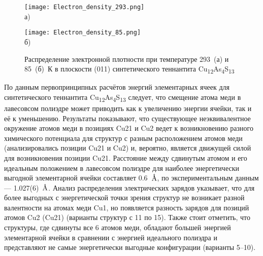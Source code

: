 \begin{figure}[ht]
  \begin{minipage}[ht]{0.5\linewidth}\centering
    \texttt{[image: Electron\_density\_293.png]} \\ а)
  \end{minipage}
  \hfill
  \begin{minipage}[ht]{0.5\linewidth}\centering
    \texttt{[image: Electron\_density\_85.png]} \\ б)
  \end{minipage}

      \caption[Распределение электронной плотности при температуре 293~(а) и 85~(б)~К в плоскости (011) синтетического теннантита Cu\textsubscript{12}As\textsubscript{4}S\textsubscript{13}]{Распределение электронной плотности при температуре 293~(а) и 85~(б)~К в плоскости (011) синтетического теннантита Cu\textsubscript{12}As\textsubscript{4}S\textsubscript{13}}
    \label{img:xray2}
\end{figure}


По данным первопринципных расчётов энергий элементарных ячеек для синтетического теннантита Cu\textsubscript{12}As\textsubscript{4}S\textsubscript{13} следует,  что смещение атома меди в лавесовсом полиэдре может приводить как к увеличению энергии ячейки, так и её к уменьшению.
Результаты показывают, что существующее неэквивалентное  окружение атомов меди в позициях Cu21 и Cu2 ведет к возникновению разного химического потенциала для структур с разным расположением атомов меди (анализировались позиции Cu21 и Cu2) и, вероятно, является движущей силой для возникновения позиции Cu21. Расстояние между сдвинутым атомом и его идеальным положением в лавесовсом полиэдре для наиболее энергетически выгодной элементарной ячейки составляет 0.6~$\mbox{\normalfont\AA}$, по экспериментальным данным --- 1.027(6)~$\mbox{\normalfont\AA}$.
Анализ распределения электрических зарядов указывает, что для более выгодных с энергетической точки зрения структур не возникает разной валентности на атомах меди Cu1,
но появляется разность зарядов для позиций атомов Cu2 (Cu21) (варианты структур с 11 по 15). Также стоит отметить, что структуры, где сдвинуты все 6 атомов меди, обладают большей энергией элементарной ячейки в сравнении с энергией идеального полиэдра и представляют не самые энергетически выгодные конфигурации  (варианты 5--10).




